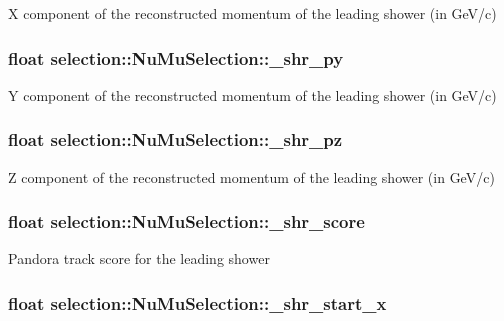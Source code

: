 X component of the reconstructed momentum of the leading shower (in Ge\-V/c) \hypertarget{classselection_1_1NuMuSelection_ac3c72fc9664d3d214a2775a5aa812fbf}{
\subsubsection[{\-\_\-shr\-\_\-py}]{\setlength{\rightskip}{0pt plus 5cm}float selection\-::\-Nu\-Mu\-Selection\-::\-\_\-shr\-\_\-py\hspace{0.3cm}{\ttfamily [private]}}}\label{classselection_1_1NuMuSelection_ac3c72fc9664d3d214a2775a5aa812fbf}
Y component of the reconstructed momentum of the leading shower (in Ge\-V/c) \hypertarget{classselection_1_1NuMuSelection_ad9b6318a95801512e9ce04c3f61e11f9}{
\subsubsection[{\-\_\-shr\-\_\-pz}]{\setlength{\rightskip}{0pt plus 5cm}float selection\-::\-Nu\-Mu\-Selection\-::\-\_\-shr\-\_\-pz\hspace{0.3cm}{\ttfamily [private]}}}\label{classselection_1_1NuMuSelection_ad9b6318a95801512e9ce04c3f61e11f9}
Z component of the reconstructed momentum of the leading shower (in Ge\-V/c) \hypertarget{classselection_1_1NuMuSelection_a3aefddb8bd817a3ddd32076f1cf7b291}{
\subsubsection[{\-\_\-shr\-\_\-score}]{\setlength{\rightskip}{0pt plus 5cm}float selection\-::\-Nu\-Mu\-Selection\-::\-\_\-shr\-\_\-score\hspace{0.3cm}{\ttfamily [private]}}}\label{classselection_1_1NuMuSelection_a3aefddb8bd817a3ddd32076f1cf7b291}
Pandora track score for the leading shower \hypertarget{classselection_1_1NuMuSelection_af38dabc2591bc0a81c564db0bb773d2c}{
\subsubsection[{\-\_\-shr\-\_\-start\-\_\-x}]{\setlength{\rightskip}{0pt plus 5cm}float selection\-::\-Nu\-Mu\-Selection\-::\-\_\-shr\-\_\-start\-\_\-x\hspace{0.3cm}{\ttfamily [private]}}}\label{classselection_1_1NuMuSelection_af38dabc2591bc0a81c564db0bb773d2c}
